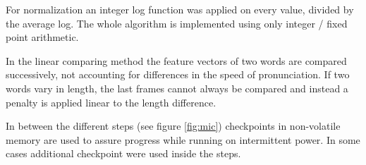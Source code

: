 For normalization an integer log function was applied on every value, divided by the average log.
The whole algorithm is implemented using only integer / fixed point arithmetic.

In the linear comparing method the feature vectors of two words are compared successively, not accounting for differences in the speed of pronunciation. If two words vary in length, the last frames cannot always be compared and instead a penalty is applied linear to the length difference.

In between the different steps (see figure \ref{fig:mic}) checkpoints in non-volatile memory are used to assure progress while running on intermittent power. In some cases additional checkpoint were used inside the steps.

